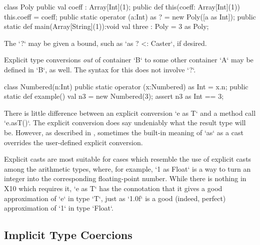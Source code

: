 \begin{ex}
\begin{xten}
class Poly {
  public val coeff : Array[Int](1);
  public def this(coeff: Array[Int](1)) { this.coeff = coeff;}
  public static operator (a:Int) as ? = new Poly([a as Int]);
  public static def main(Array[String](1)):void {
     val three : Poly = 3 as Poly;
  }
}
\end{xten}
%
\end{ex}


The \xcd`?` may be given a bound, such as \xcd`as ? <: Caster`, if desired.
  
Explicit type conversions {\em out} of container \xcd`B` to some other
container \xcd`A` may be defined in \xcd`B`, as well.  The syntax for this
does not involve \xcd`?`.  

\begin{ex}
\begin{xten}
class Numbered(n:Int) {
  public static operator (x:Numbered) as Int = x.n;
  public static def example(){
     val n3 = new Numbered(3);
     assert n3 as Int == 3;
  }
}
\end{xten}

\end{ex}


There is little difference between an explicit conversion \xcd`e as T` and a
method call \xcd`e.asT()`.  The explicit conversion does say undeniably what
the result type will be.  However, as described in ,
sometimes the built-in meaning of \xcd`as` as a cast overrides the
user-defined explicit conversion.  

Explicit casts are most suitable for cases
which resemble the use of explicit casts among the arithmetic types, where, 
for example, \xcd`1 as Float` is a way to turn an integer into the
corresponding floating-point number.  
While there is nothing in X10 which
requires it, \xcd`e as T` has the connotation that it gives a good
approximation of \xcd`e` in type \xcd`T`, just as \xcd`1.0f` is a good
(indeed, perfect) approximation of \xcd`1` in type \xcd`Float`.  

\subsection{Implicit Type Coercions}
\label{sect:ImplicitCoercion}

